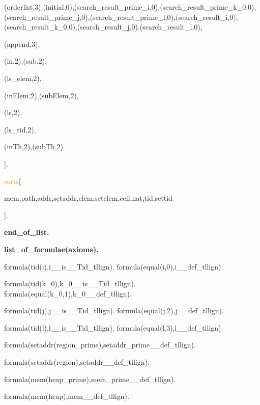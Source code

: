 
    (orderlist,3),(initial,0),(search\_result\_prime\_i,0),(search\_result\_prime\_k\_0,0),(search\_result\_prime\_j,0),(search\_result\_prime\_l,0),(search\_result\_i,0),(search\_result\_k\_0,0),(search\_result\_j,0),(search\_result\_l,0),


    (append,3),


    


    (in,2),(sub,2),


    (ls\_elem,2),


    (inElem,2),(subElem,2),


    


    (ls,2),


    (ls\_tid,2),


    (inTh,2),(subTh,2)

].

\textcolor{orange}{sorts}[

    mem,path,addr,setaddr,elem,setelem,cell,nat,tid,settid

].

\textbf{end\_of\_list.}


\textbf{list\_of\_formulae(axioms).}


formula(tid(i),i\_\_is\_\_Tid\_tllign). formula(equal(i,0),i\_\_def\_tllign).

formula(tid(k\_0),k\_0\_\_is\_\_Tid\_tllign). formula(equal(k\_0,1),k\_0\_\_def\_tllign).

formula(tid(j),j\_\_is\_\_Tid\_tllign). formula(equal(j,2),j\_\_def\_tllign).

formula(tid(l),l\_\_is\_\_Tid\_tllign). formula(equal(l,3),l\_\_def\_tllign).

formula(setaddr(region\_prime),setaddr\_prime\_\_def\_tllign).

formula(setaddr(region),setaddr\_\_def\_tllign).

formula(mem(heap\_prime),mem\_prime\_\_def\_tllign).

formula(mem(heap),mem\_\_def\_tllign).

